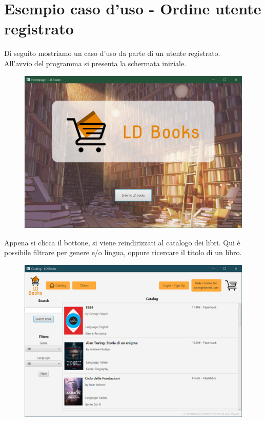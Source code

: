 \documentclass[a4paper,11pt]{report}
\begin{document}
\section{Esempio caso d'uso - Ordine utente registrato}
Di seguito mostriamo un caso d'uso da parte di un utente registrato. \\All'avvio del programma si presenta la schermata iniziale.

\begin{figure}[h!]
	\centering
	\includegraphics[width=0.8\linewidth]{Screenshots/homepage.png}
\end{figure}

Appena si clicca il bottone, si viene reindirizzati al catalogo dei libri. Qui è possibile filtrare per genere e/o lingua, oppure ricercare il titolo di un libro.

\begin{figure}[h!]
	\centering
	\includegraphics[width=0.8\linewidth]{Screenshots/catalogo.png}
\end{figure}
\newpage
\end{document}
